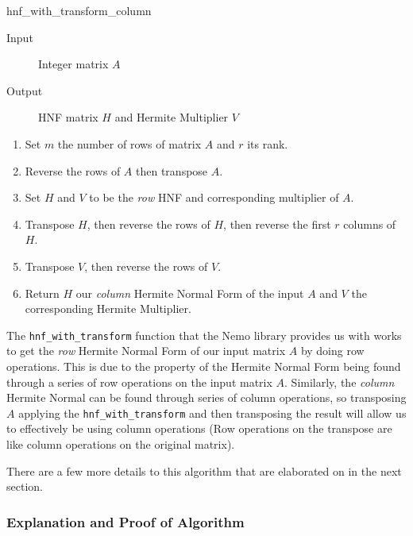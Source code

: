 \documentclass[oneside, a4paper, onecolumn, 11pt]{article}
\begin{document}
\begin{algorithm}[H]
    \caption{hnf\_with\_transform\_column}

    \begin{description}
        \item[Input] Integer matrix \(A\)
        \item[Output] HNF matrix \(H\) and Hermite Multiplier \(V\)
    \end{description}

    \begin{enumerate}[label = \textbf{(Step~\arabic*)}, leftmargin=*, align=left, labelsep=2pt, itemsep=0pt]
        \item Set \(m\) the number of rows of matrix \(A\) and \(r\) its rank.
        \item Reverse the rows of \(A\) then transpose \(A\).
        \item Set \(H\) and \(V\) to be the \textit{row} HNF and corresponding multiplier of \(A\).
        \item Transpose \(H\), then reverse the rows of \(H\), then reverse the first \(r\) columns of \(H\).
        \item Transpose \(V\), then reverse the rows of \(V\).
        \item Return \(H\) our \textit{column} Hermite Normal Form of the input \(A\) and \(V\) the corresponding Hermite Multiplier.
    \end{enumerate}
\end{algorithm}

The \texttt{hnf\_with\_transform} function that the Nemo library provides us with works to get the \textit{row} Hermite Normal Form of our input matrix \(A\) by doing row operations. This is due to the property of the Hermite Normal Form being found through a series of row operations on the input matrix \(A\). Similarly, the \textit{column} Hermite Normal can be found through series of column operations, so transposing \(A\) applying the \texttt{hnf\_with\_transform} and then transposing the result will allow us to effectively be using column operations (Row operations on the transpose are like column operations on the original matrix).

There are a few more details to this algorithm that are elaborated on in the next section.

\subsubsection{Explanation and Proof of Algorithm}
\end{document}
